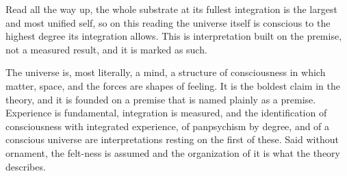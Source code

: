 Read all the way up, the whole substrate at its fullest integration is the largest and most unified self, so on
this reading the universe itself is conscious to the highest degree its integration allows. This is interpretation
built on the premise, not a measured result, and it is marked as such.


The universe is, most literally, a mind, a structure of consciousness in which
matter, space, and the forces are shapes of feeling. It is the boldest claim in the theory, and it is founded on a
premise that is named plainly as a premise. Experience is fundamental, integration is measured, and the
identification of consciousness with integrated experience, of panpsychism by degree, and of a conscious universe
are interpretations resting on the first of these. Said without ornament, the felt-ness is assumed and the
organization of it is what the theory describes.
